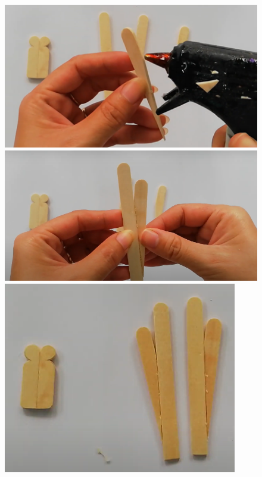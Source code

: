 \begin{multicols}{2}
\begin{figure}[H]
		\includegraphics[width= 1\linewidth]{52}
		\includegraphics[width= 1\linewidth]{53}
		\includegraphics[width= 1\linewidth]{54}
		\vspace*{-10pt}
	\end{figure}

\end{multicols}
